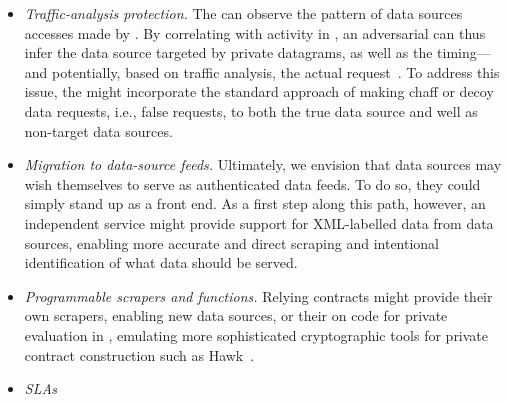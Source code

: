 \begin{itemize}
\item{\em Traffic-analysis protection.} The \medname can observe the pattern of data sources accesses made by \tc. By correlating with activity in \tcont, an adversarial \medname can thus infer the data source targeted by private datagrams, as well as the timing---and potentially, based on traffic analysis, the actual request~\cite{XiaoFeng}. To address this issue, the \encname might incorporate the standard approach of making chaff or decoy data requests, i.e., false requests, to both the true data source and well as non-target data sources.
\item{\em Migration to data-source feeds.} Ultimately, we envision that data sources may wish themselves to serve as authenticated data feeds. To do so, they could simply stand up \tc as a front end. As a first step along this path, however, an independent \tc service might provide support for XML-labelled data from data sources, enabling more accurate and direct scraping and intentional identification of what data should be served.  
\item{\em Programmable scrapers and functions.} Relying contracts might provide their own scrapers, enabling new data sources, or their on code for private evaluation in \tc, emulating more sophisticated cryptographic tools for private contract construction such as Hawk~\cite{}. 
\item{\em SLAs}
\end{itemize}


